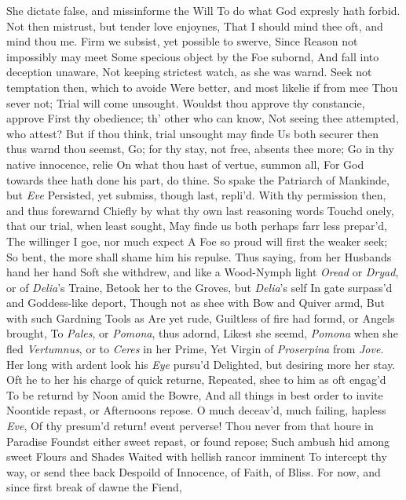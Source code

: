 \documentclass[11pt]{book}
\newcounter {first}
\newcounter {last}
\begin{document}
She dictate false, and missinforme the Will 
To do what God expresly hath forbid. 
Not then mistrust, but tender love enjoynes, 
That I should mind thee oft, and mind thou me. 
Firm we subsist, yet possible to swerve, 
Since Reason not impossibly may meet 
Some specious object by the Foe subornd, 
And fall into deception unaware, 
Not keeping strictest watch, as she was warnd. 
Seek not temptation then, which to avoide 
Were better, and most likelie if from mee 
Thou sever not; Trial will come unsought. 
Wouldst thou approve thy constancie, approve 
First thy obedience; th' other who can know, 
Not seeing thee attempted, who attest? 
But if thou think, trial unsought may finde 
Us both securer then thus warnd thou seemst, 
Go; for thy stay, not free, absents thee more; 
Go in thy native innocence, relie 
On what thou hast of vertue, summon all, 
For God towards thee hath done his part, do thine. 
\quad So spake the Patriarch of Mankinde, but \textit{Eve} 
Persisted, yet submiss, though last, repli'd. 
\quad With thy permission then, and thus forewarnd 
Chiefly by what thy own last reasoning words 
Touchd onely, that our trial, when least sought, 
May finde us both perhaps farr less prepar'd, 
The willinger I goe, nor much expect 
A Foe so proud will first the weaker seek; 
So bent, the more shall shame him his repulse. 
Thus saying, from her Husbands hand her hand 
Soft she withdrew, and like a Wood-Nymph light 
\textit{Oread} or \textit{Dryad}, or of \textit{Delia}'s Traine, 
Betook her to the Groves, but \textit{Delia}'s self 
In gate surpass'd and Goddess-like deport, 
Though not as shee with Bow and Quiver armd, 
But with such Gardning Tools as Are yet rude, 
Guiltless of fire had formd, or Angels brought, 
To \textit{Pales}, or \textit{Pomona}, thus adornd, 
Likest she seemd, \textit{Pomona} when she fled 
\textit{Vertumnus}, or to \textit{Ceres} in her Prime, 
Yet Virgin of \textit{Proserpina} from \textit{Jove}. 
Her long with ardent look his \textit{Eye} pursu'd 
Delighted, but desiring more her stay. 
Oft he to her his charge of quick returne, 
Repeated, shee to him as oft engag'd 
To be returnd by Noon amid the Bowre, 
And all things in best order to invite 
Noontide repast, or Afternoons repose. 
O much deceav'd, much failing, hapless \textit{Eve}, 
Of thy presum'd return! event perverse! 
Thou never from that houre in Paradise 
Foundst either sweet repast, or found repose; 
Such ambush hid among sweet Flours and Shades 
Waited with hellish rancor imminent 
To intercept thy way, or send thee back 
Despoild of Innocence, of Faith, of Bliss. 
For now, and since first break of dawne the Fiend, 
\end{document}
